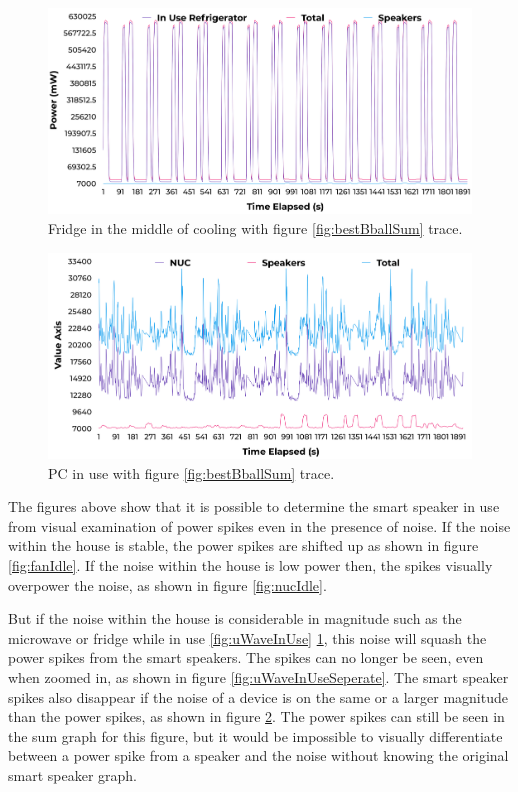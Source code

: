 \begin{figure}[H]
  \centering
  \includegraphics[width=1\textwidth]{figures/inUseFridgeNoise.png}
  \caption{Fridge in the middle of cooling with figure \ref{fig:bestBballSum} trace.}
  \label{fig:fridgeInUse}
\end{figure}

\begin{figure}[H]
  \centering
  \includegraphics[width=1\textwidth]{figures/inUseNUCNoise.png}
  \caption{PC in use with figure \ref{fig:bestBballSum} trace.}
  \label{fig:nucInUse}
\end{figure}

The figures above show that it is possible to determine the smart speaker in use from visual examination of power spikes even in the presence of noise. If the noise within the house is stable, the power spikes are shifted up as shown in figure \ref{fig:fanIdle}. If the noise within the house is low power then, the spikes visually overpower the noise, as shown in figure \ref{fig:nucIdle}.

But if the noise within the house is considerable in magnitude such as the microwave or fridge while in use \ref{fig:uWaveInUse} \ref{fig:fridgeInUse}, this noise will squash the power spikes from the smart speakers. The spikes can no longer be seen, even when zoomed in, as shown in figure \ref{fig:uWaveInUseSeperate}. The smart speaker spikes also disappear if the noise of a device is on the same or a larger magnitude than the power spikes, as shown in figure \ref{fig:nucInUse}. The power spikes can still be seen in the sum graph for this figure, but it would be impossible to visually differentiate between a power spike from a speaker and the noise without knowing the original smart speaker graph.

